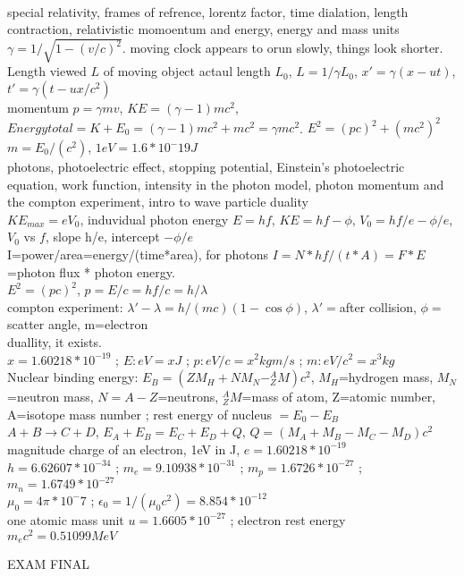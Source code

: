 \documentclass{article}
\begin{document}
\begin{large}
\\\indent special relativity, frames of refrence, lorentz factor, time dialation, length contraction, relativistic momoentum and energy, energy and mass units
\\$\gamma=1/\sqrt{1-(v/c)^2}$. moving clock appears to orun slowly, things look shorter. Length viewed $L$ of moving object actaul length $L_0$, $L=1/\gamma L_0$, $x'=\gamma(x-ut)$, $t'=\gamma(t-ux/c^2)$
\\momentum $p=\gamma mv$, $KE=(\gamma-1)mc^2$, $Energy total=K+E_0=(\gamma-1)mc^2+mc^2=\gamma mc^2$. $E^2=(pc)^2+(mc^2)^2$
\\$m=E_0/(c^2)$, $1eV=1.6*10^-19 J$
\\\indent photons, photoelectric effect, stopping potential, Einstein's photoelectric equation, work function, intensity in the photon model, photon momentum and the compton experiment, intro to wave particle duality
\\$KE_{max}=eV_0$, induvidual photon energy $E=hf$, $KE=hf-\phi$, $V_0=hf/e-\phi/e$, $V_0$ vs $f$, slope h/e, intercept $-\phi/e$
\\I=power/area=energy/(time*area), for photons $I=N*hf/(t*A)=F*E$=photon flux * photon energy.
\\$E^2=(pc)^2$, $p=E/c=hf/c=h/\lambda$
\\compton experiment: $\lambda'-\lambda=h/(mc)(1-\cos\phi)$, $\lambda'=$after collision, $\phi=$scatter angle, m=electron
\\duallity, it exists.
\\$x=1.60218*10^{-19}$ ; $E: eV=x J$ ; $p: eV/c = x^2 kg m/s$ ; $m: eV/c^2=x^3 kg$
\\Nuclear binding energy: $E_B=(ZM_H+NM_N-^A_ZM)c^2$, $M_H$=hydrogen mass, $M_N$=neutron mass, $N=A-Z$=neutrons, $^A_ZM$=mass of atom, Z=atomic number, A=isotope mass number ; rest energy of nucleus $=E_0-E_B$
\\$A+B\rightarrow C+D$, $E_A+E_B=E_C+E_D+Q$, $Q=(M_A+M_B-M_C-M_D)c^2$
\\magnitude charge of an electron, 1eV in J, $e=1.60218*10^{-19}$
\\$h=6.62607*10^{-34}$ ; $m_e=9.10938*10^{-31}$ ; $m_p=1.6726*10^{-27}$ ; $m_n=1.6749*10^{-27}$
\\$\mu_0=4\pi*10^-7$ ; $\epsilon_0=1/(\mu_0c^2)=8.854*10^{-12}$
\\one atomic mass unit $u=1.6605*10^{-27}$ ; electron rest energy $m_ec^2=0.51099MeV$
\\
\begin{Large}EXAM FINAL\end{Large} 

\end{large}
\end{document}
